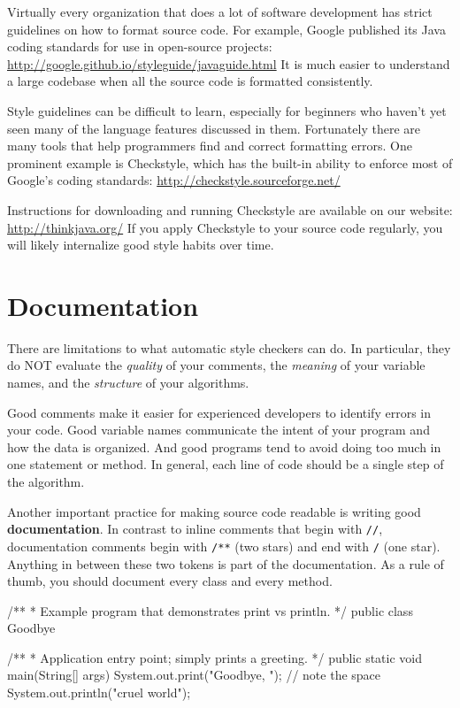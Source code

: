 Virtually every organization that does a lot of software development has strict guidelines on how to format source code.
For example, Google published its Java coding standards for use in open-source projects:
\url{http://google.github.io/styleguide/javaguide.html}
It is much easier to understand a large codebase when all the source code is formatted consistently.

Style guidelines can be difficult to learn, especially for beginners who haven't yet seen many of the language features discussed in them.
Fortunately there are many tools that help programmers find and correct formatting errors.
One prominent example is Checkstyle, which has the built-in ability to enforce most of Google's coding standards:
\url{http://checkstyle.sourceforge.net/}

Instructions for downloading and running Checkstyle are available on our website: \url{http://thinkjava.org/}
If you apply Checkstyle to your source code regularly, you will likely internalize good style habits over time.


\section{Documentation}

There are limitations to what automatic style checkers can do.
In particular, they do NOT evaluate the {\em quality} of your comments, the {\em meaning} of your variable names, and the {\em structure} of your algorithms.

Good comments make it easier for experienced developers to identify errors in your code.
Good variable names communicate the intent of your program and how the data is organized.
And good programs tend to avoid doing too much in one statement or method.
In general, each line of code should be a single step of the algorithm.


Another important practice for making source code readable is writing good {\bf documentation}.
In contrast to inline comments that begin with {\tt //}, documentation comments begin with {\tt /**} (two stars) and end with {\tt */} (one star).
Anything in between these two tokens is part of the documentation.
As a rule of thumb, you should document every class and every method.

\begin{code}
/**
 * Example program that demonstrates print vs println.
 */
public class Goodbye {

    /**
     * Application entry point; simply prints a greeting.
     */
    public static void main(String[] args) {
        System.out.print("Goodbye, ");  // note the space
        System.out.println("cruel world");
    }

}
\end{code}

